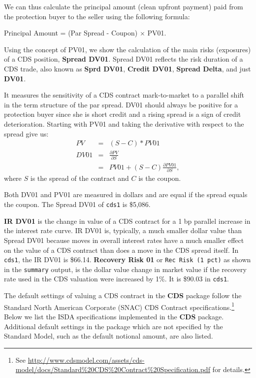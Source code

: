 \documentclass[a4paper]{article}
\begin{document}
We can thus calculate the principal amount (clean upfront payment)
paid from the protection buyer to the seller using the following
formula:
\begin{center}
  Principal Amount = (Par Spread - Coupon) $\times$ PV01.
\end{center}

Using the concept of PV01, we show the calculation of the main risks
(exposures) of a CDS position, \textbf{Spread DV01}. Spread DV01
reflects the risk duration of a CDS trade, also known as \textbf{Sprd
  DV01}, \textbf{Credit DV01}, \textbf{Spread Delta}, and just
\textbf{DV01}. 

It measures the sensitivity of a CDS contract mark-to-market to a
parallel shift in the term structure of the par spread. DV01 should
always be positive for a protection buyer since she is short credit
and a rising spread is a sign of credit deterioration. Starting with
PV01 and taking the derivative with respect to the spread give us:
\begin{eqnarray}
  PV & = & (S - C) * PV01 \nonumber \\
  DV01 & = & \frac{\partial PV}{\partial S} \nonumber \\
  & = & PV01 + (S - C) \frac{\partial PV01}{\partial S},\nonumber
\end{eqnarray}
where $S$ is the spread of the contract and $C$ is the coupon.

Both DV01 and PV01 are measured in dollars and are equal if the spread
equals the coupon. The Spread DV01 of \texttt{cds1} is \$5,086.

\textbf{IR DV01} is the change in value of a CDS contract for a 1 bp
parallel increase in the interest rate curve. IR DV01 is, typically, a
much smaller dollar value than Spread DV01 because moves in overall
interest rates have a much smaller effect on the value of a CDS
contract than does a move in the CDS spread itself. In \texttt{cds1},
the IR DV01 is \$66.14. \textbf{Recovery Risk 01} or \texttt{Rec Risk
  (1 pct)} as shown in the \texttt{summary} output, is the dollar
value change in market value if the recovery rate used in the CDS
valuation were increased by 1\%. It is \$90.03 in \texttt{cds1}.


The default settings of valuing a CDS contract in the \textbf{CDS}
package follow the Standard North American Corporate (SNAC) CDS
Contract specifications.\footnote{See
  \url{http://www.cdsmodel.com/assets/cds-model/docs/Standard\%20CDS\%20Contract\%20Specification.pdf}
  for details.} Below we list the ISDA specifications implemented in
the \textbf{CDS} package. Additional default settings in the package
which are not specified by the Standard Model, such as the default
notional amount, are also listed.
\end{document}
